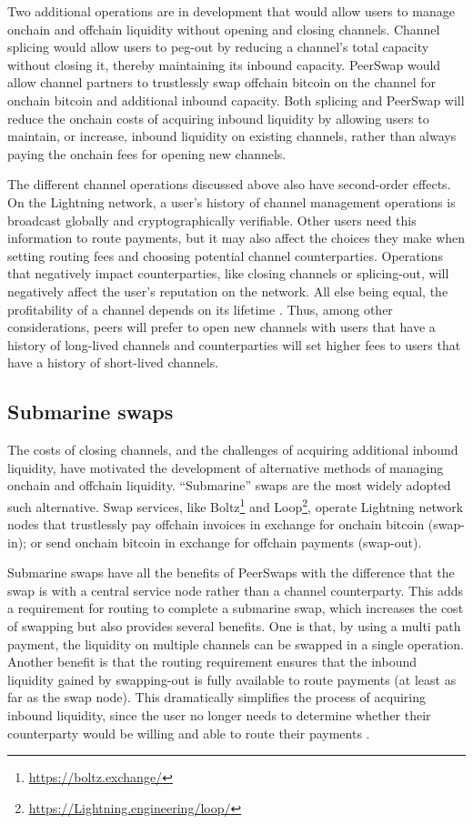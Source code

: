 \documentclass[10pt,twocolumn]{article}
\begin{document}
Two additional operations are in development that would allow users to
manage onchain and offchain liquidity without opening and closing channels.
Channel splicing \citep{russel2018} would allow
users to peg-out by reducing a channel's total capacity
without closing it, thereby maintaining its inbound capacity.
PeerSwap \citep{togami2021} would allow channel partners to trustlessly
swap offchain bitcoin on the channel for onchain bitcoin
and additional inbound capacity.
Both splicing and PeerSwap will reduce the onchain costs of
acquiring inbound liquidity
by allowing users to maintain, or increase, inbound liquidity on existing channels,
rather than always paying the onchain fees for opening new channels.

The different channel operations discussed above
also have second-order effects.
On the Lightning network,
a user's history of channel management operations
is broadcast globally and cryptographically verifiable.
Other users need this information to route payments,
but it may also affect the choices they make
when setting routing fees and choosing potential channel counterparties.
Operations that negatively impact counterparties,
like closing channels or splicing-out,
will negatively affect the user's reputation on the network.
All else being equal,
the profitability of a channel depends on its lifetime \citep{branzei2018}.
Thus, among other considerations,
peers will prefer to open new channels
with users that have a history of long-lived channels
and counterparties will set higher fees to users
that have a history of short-lived channels.

\subsection{Submarine swaps}

The costs of closing channels,
and the challenges of acquiring additional inbound liquidity,
have motivated the development of alternative methods of
managing onchain and offchain liquidity.
``Submarine'' swaps \citep{bosworth2018} are the most widely adopted such alternative.
Swap services,
like Boltz\footnote{\url{https://boltz.exchange/}}
and Loop\footnote{\url{https://Lightning.engineering/loop/}},
operate Lightning network nodes that trustlessly
pay offchain invoices in exchange for onchain bitcoin (swap-in); or
send onchain bitcoin in exchange for offchain payments (swap-out).

Submarine swaps have all the benefits of PeerSwaps with the difference
that the swap is with a central service node rather than a channel counterparty.
This adds a requirement for routing to complete a submarine swap,
which increases the cost of swapping but also provides several benefits.
One is that, by using a multi path payment,
the liquidity on multiple channels can be swapped in a single operation.
Another benefit is that
the routing requirement ensures that the inbound
liquidity gained by swapping-out is fully available to route payments
(at least as far as the swap node).
This dramatically simplifies the process of acquiring inbound liquidity,
since the user no longer needs to determine whether
their counterparty would be willing and able to route their payments
\citep{ZmnSCPxj2020}.
\end{document}
